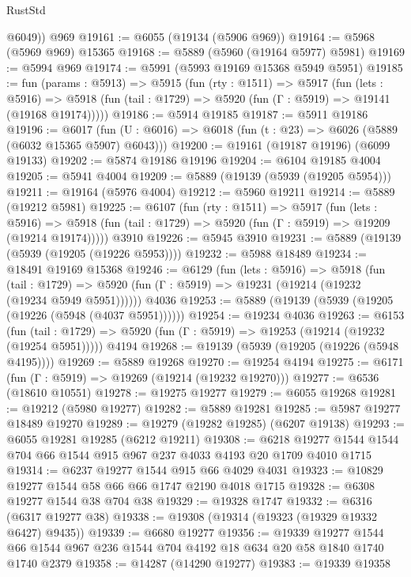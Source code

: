 \begin{lexlean}{RustStd}
\begin{coremodule}
        @6049))
    @969
@19161 := @6055 (@19134 (@5906 @969))
@19164 := @5968 (@5969 @969) @15365
@19168 := @5889 (@5960 (@19164 @5977) @5981)
@19169 := @5994 @969
@19174 := @5991 (@5993 @19169 @15368 @5949 @5951)
@19185 := fun (params : @5913) =>
  @5915
    (fun (rty : @1511) =>
    @5917
      (fun (lets : @5916) =>
      @5918 (fun (tail : @1729) => @5920 (fun (Γ : @5919) => @19141 (@19168 @19174)))))
@19186 := @5914 @19185
@19187 := @5911 @19186
@19196 := @6017
    (fun (U : @6016) => @6018 (fun (t : @23) => @6026 (@5889 (@6032 @15365 @5907) @6043)))
@19200 := @19161 (@19187 @19196) (@6099 @19133)
@19202 := @5874 @19186 @19196
@19204 := @6104 @19185 @4004
@19205 := @5941 @4004
@19209 := @5889 (@19139 (@5939 (@19205 @5954)))
@19211 := @19164 (@5976 @4004)
@19212 := @5960 @19211
@19214 := @5889 (@19212 @5981)
@19225 := @6107
    (fun (rty : @1511) =>
    @5917
      (fun (lets : @5916) =>
      @5918 (fun (tail : @1729) => @5920 (fun (Γ : @5919) => @19209 (@19214 @19174)))))
    @3910
@19226 := @5945 @3910
@19231 := @5889 (@19139 (@5939 (@19205 (@19226 @5953))))
@19232 := @5988 @18489
@19234 := @18491 @19169 @15368
@19246 := @6129
    (fun (lets : @5916) =>
    @5918
      (fun (tail : @1729) =>
      @5920 (fun (Γ : @5919) => @19231 (@19214 (@19232 (@19234 @5949 @5951))))))
    @4036
@19253 := @5889 (@19139 (@5939 (@19205 (@19226 (@5948 (@4037 @5951))))))
@19254 := @19234 @4036
@19263 := @6153
    (fun (tail : @1729) => @5920 (fun (Γ : @5919) => @19253 (@19214 (@19232 (@19254 @5951)))))
    @4194
@19268 := @19139 (@5939 (@19205 (@19226 (@5948 @4195))))
@19269 := @5889 @19268
@19270 := @19254 @4194
@19275 := @6171 (fun (Γ : @5919) => @19269 (@19214 (@19232 @19270)))
@19277 := @6536 (@18610 @10551)
@19278 := @19275 @19277
@19279 := @6055 @19268
@19281 := @19212 (@5980 @19277)
@19282 := @5889 @19281
@19285 := @5987 @19277 @18489 @19270
@19289 := @19279 (@19282 @19285) (@6207 @19138)
@19293 := @6055 @19281 @19285 (@6212 @19211)
@19308 := @6218 @19277 @1544 @1544 @704 @66 @1544 @915 @967 @237 @4033 @4193 @20 @1709 @4010 @1715
@19314 := @6237 @19277 @1544 @915 @66 @4029 @4031
@19323 := @10829 @19277 @1544 @58 @66 @66 @1747 @2190 @4018 @1715
@19328 := @6308 @19277 @1544 @38 @704 @38
@19329 := @19328 @1747
@19332 := @6316 (@6317 @19277 @38)
@19338 := @19308 (@19314 (@19323 (@19329 @19332 @6427) @9435))
@19339 := @6680 @19277
@19356 := @19339
    @19277
    @1544
    @66
    @1544
    @967
    @236
    @1544
    @704
    @4192
    @18
    @634
    @20
    @58
    @1840
    @1740
    @1740
    @2379
@19358 := @14287 (@14290 @19277)
@19383 := @19339
    @19358

\end{coremodule}
\end{lexlean}
